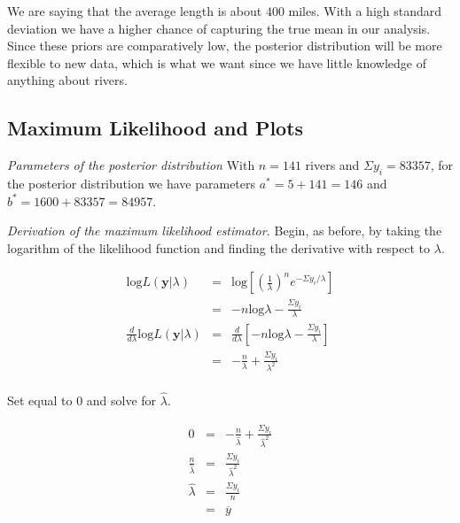 \documentclass[12pt]{article}
\newcommand{\ybar}{\overline{y}}
\begin{document}
\noindent We are saying that the average length is about $400$ miles.  With a high standard deviation we have a higher chance of capturing the true mean in our analysis.  Since these priors are comparatively low, the posterior distribution will be more flexible to new data, which is what we want since we have little knowledge of anything about rivers.

\subsection{Maximum Likelihood and Plots}

%

\noindent \emph{Parameters of the posterior distribution} With $n=141$ rivers and $\Sigma y_i=83357$, for the posterior distribution we have parameters $a^*=5+141=146$ and $b^*=1600+83357=84957$.
\bigskip

\noindent \emph{Derivation of the maximum likelihood estimator.} Begin, as before, by taking the logarithm of the likelihood function and finding the derivative with respect to $\lambda$.

\begin{eqnarray*}
\mathrm{log}L(\mathbf{y}|\lambda) &=& \mathrm{log}\left[\left(\frac{1}{\lambda}\right)^ne^{-\Sigma y_i/\lambda}\right] \\
&=& -n\mathrm{log}\lambda-\frac{\Sigma y_i}{\lambda} \\
\frac{d}{d\lambda}\mathrm{log}L(\mathbf{y}|\lambda) &=& \frac{d}{d\lambda}\left[-n\mathrm{log}\lambda-\frac{\Sigma y_i}{\lambda}\right] \\
&=& -\frac{n}{\lambda}+\frac{\Sigma y_i}{\lambda^2} \\
\end{eqnarray*}

\noindent Set equal to 0 and solve for $\hat{\lambda}$.

\begin{eqnarray*}
0 &=& -\frac{n}{\hat{\lambda}}+\frac{\Sigma y_i}{\hat{\lambda}^2} \\
\frac{n}{\hat{\lambda}} &=& \frac{\Sigma y_i}{\hat{\lambda}^2} \\
\hat{\lambda} &=& \frac{\Sigma y_i}{n} \\
&=& \ybar \\
\end{eqnarray*}
\end{document}
